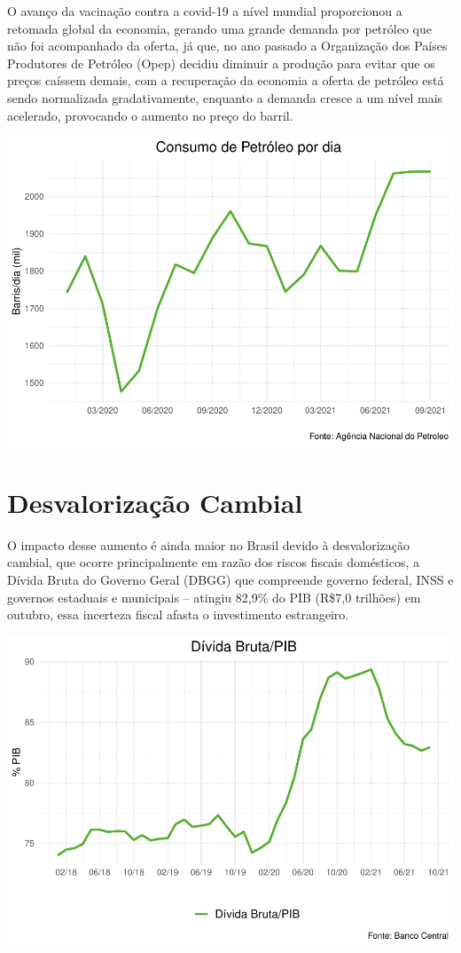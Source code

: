 \documentclass[100,a4paperpaper,]{article}
\begin{document}
O avanço da vacinação contra a covid-19 a nível mundial proporcionou a
retomada global da economia, gerando uma grande demanda por petróleo que
não foi acompanhado da oferta, já que, no ano passado a Organização dos
Países Produtores de Petróleo (Opep) decidiu diminuir a produção para
evitar que os preços caíssem demais, com a recuperação da economia a
oferta de petróleo está sendo normalizada gradativamente, enquanto a
demanda cresce a um nível mais acelerado, provocando o aumento no preço
do barril.

\includegraphics{inflacao_files/figure-latex/Consumo Petroleo-1.pdf}
\newpage

\section{Desvalorização Cambial} 
 \vspace{0,5cm}

O impacto desse aumento é ainda maior no Brasil devido à desvalorização
cambial, que ocorre principalmente em razão dos riscos fiscais
domésticos, a Dívida Bruta do Governo Geral (DBGG) que compreende
governo federal, INSS e governos estaduais e municipais -- atingiu
82,9\% do PIB (R\$7,0 trilhões) em outubro, essa incerteza fiscal afasta
o investimento estrangeiro.

\includegraphics{inflacao_files/figure-latex/Divida Bruta/PIB-1.pdf}
\newpage
\end{document}
